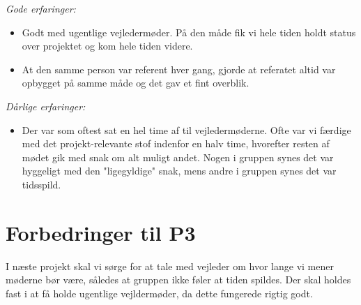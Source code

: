 \emph{Gode erfaringer:}
\begin{itemize}

\item Godt med ugentlige vejledermøder. På den måde fik vi hele tiden holdt status over projektet og kom hele tiden videre.

\item At den samme person var referent hver gang, gjorde at referatet altid var opbygget på samme måde og det gav et fint overblik.
\end{itemize}\emph{Dårlige erfaringer:}
\begin{itemize}
\item	Der var som oftest sat en hel time af til vejledermøderne. Ofte var vi færdige med det projekt-relevante stof indenfor en halv time, hvorefter resten af mødet gik med snak om alt muligt andet. Nogen i gruppen synes det var hyggeligt med den "ligegyldige" snak, mens andre i gruppen synes det var tidsspild.

\end{itemize}

\section{Forbedringer til P3}

I næste projekt skal vi sørge for at tale med vejleder om hvor lange vi mener møderne bør være, således at gruppen ikke føler at tiden spildes. Der skal holdes fast i at få holde ugentlige vejldermøder, da dette fungerede rigtig godt. 
